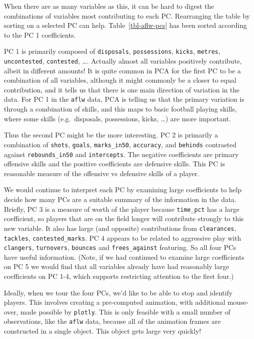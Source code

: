 \documentclass[
  letterpaper,
]{krantz}
\begin{document}
When there are as many variables as this, it can be hard to digest the
combinations of variables most contributing to each PC. Rearranging the
table by sorting on a selected PC can help. Table~\ref{tbl-aflw-pcs} has
been sorted according to the PC 1 coefficients.

PC 1 is primarily composed of \texttt{disposals}, \texttt{possessions},
\texttt{kicks}, \texttt{metres}, \texttt{uncontested},
\texttt{contested}, \ldots. Actually almost all variables positively
contribute, albeit in different amounts! It is quite common in PCA for
the first PC to be a combination of all variables, although it might
commonly be a closer to equal contribution, and it tells us that there
is one main direction of variation in the data. For PC 1 in the
\texttt{aflw} data, PCA is telling us that the primary variation is
through a combination of skills, and this maps to basic football playing
skills, where some skills (e.g.~disposals, possessions, kicks, \ldots)
are more important.

Thus the second PC might be the more interesting. PC 2 is primarily a
combination of \texttt{shots}, \texttt{goals}, \texttt{marks\_in50},
\texttt{accuracy}, and \texttt{behinds} contrasted against
\texttt{rebounds\_in50} and \texttt{intercepts}. The negative
coefficients are primary offensive skills and the positive coefficients
are defensive skills. This PC is reasonable measure of the offensive vs
defensive skills of a player.


We would continue to interpret each PC by examining large coefficients
to help decide how many PCs are a suitable summary of the information in
the data. Briefly, PC 3 is a measure of worth of the player because
\texttt{time\_pct} has a large coefficient, so players that are on the
field longer will contribute strongly to this new variable. It also has
large (and opposite) contributions from \texttt{clearances},
\texttt{tackles}, \texttt{contested\_marks}. PC 4 appears to be related
to aggressive play with \texttt{clangers}, \texttt{turnovers},
\texttt{bounces} and \texttt{frees\_against} featuring. So all four PCs
have useful information. (Note, if we had continued to examine large
coefficients on PC 5 we would find that all variables already have had
reasonably large coefficients on PC 1-4, which supports restricting
attention to the first four.)

Ideally, when we tour the four PCs, we'd like to be able to stop and
identify players. This involves creating a pre-computed animation, with
additional mouse-over, made possible by \texttt{plotly}. This is only
feasible with a small number of observations, like the \texttt{aflw}
data, because all of the animation frames are constructed in a single
object. This object gets large very quickly!
\end{document}
